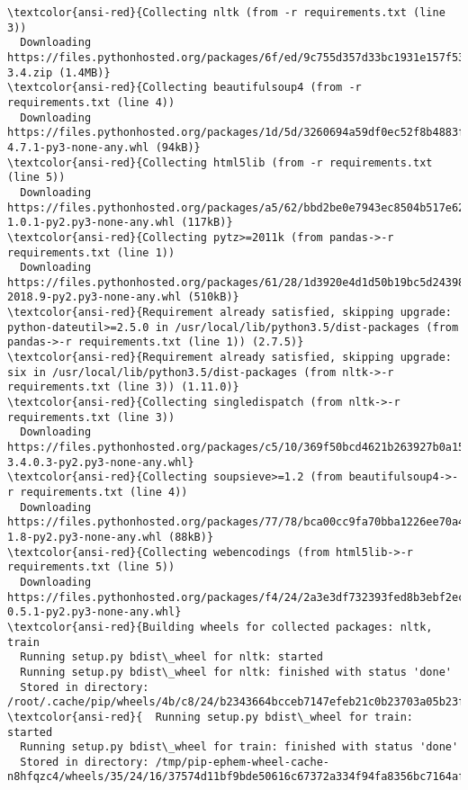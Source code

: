 \documentclass[11pt]{article}
\begin{document}
\begin{Verbatim}[commandchars=\\\{\}]
\textcolor{ansi-red}{Collecting nltk (from -r requirements.txt (line 3))
  Downloading https://files.pythonhosted.org/packages/6f/ed/9c755d357d33bc1931e157f537721efb5b88d2c583fe593cc09603076cc3/nltk-3.4.zip (1.4MB)}
\textcolor{ansi-red}{Collecting beautifulsoup4 (from -r requirements.txt (line 4))
  Downloading https://files.pythonhosted.org/packages/1d/5d/3260694a59df0ec52f8b4883f5d23b130bc237602a1411fa670eae12351e/beautifulsoup4-4.7.1-py3-none-any.whl (94kB)}
\textcolor{ansi-red}{Collecting html5lib (from -r requirements.txt (line 5))
  Downloading https://files.pythonhosted.org/packages/a5/62/bbd2be0e7943ec8504b517e62bab011b4946e1258842bc159e5dfde15b96/html5lib-1.0.1-py2.py3-none-any.whl (117kB)}
\textcolor{ansi-red}{Collecting pytz>=2011k (from pandas->-r requirements.txt (line 1))
  Downloading https://files.pythonhosted.org/packages/61/28/1d3920e4d1d50b19bc5d24398a7cd85cc7b9a75a490570d5a30c57622d34/pytz-2018.9-py2.py3-none-any.whl (510kB)}
\textcolor{ansi-red}{Requirement already satisfied, skipping upgrade: python-dateutil>=2.5.0 in /usr/local/lib/python3.5/dist-packages (from pandas->-r requirements.txt (line 1)) (2.7.5)}
\textcolor{ansi-red}{Requirement already satisfied, skipping upgrade: six in /usr/local/lib/python3.5/dist-packages (from nltk->-r requirements.txt (line 3)) (1.11.0)}
\textcolor{ansi-red}{Collecting singledispatch (from nltk->-r requirements.txt (line 3))
  Downloading https://files.pythonhosted.org/packages/c5/10/369f50bcd4621b263927b0a1519987a04383d4a98fb10438042ad410cf88/singledispatch-3.4.0.3-py2.py3-none-any.whl}
\textcolor{ansi-red}{Collecting soupsieve>=1.2 (from beautifulsoup4->-r requirements.txt (line 4))
  Downloading https://files.pythonhosted.org/packages/77/78/bca00cc9fa70bba1226ee70a42bf375c4e048fe69066a0d9b5e69bc2a79a/soupsieve-1.8-py2.py3-none-any.whl (88kB)}
\textcolor{ansi-red}{Collecting webencodings (from html5lib->-r requirements.txt (line 5))
  Downloading https://files.pythonhosted.org/packages/f4/24/2a3e3df732393fed8b3ebf2ec078f05546de641fe1b667ee316ec1dcf3b7/webencodings-0.5.1-py2.py3-none-any.whl}
\textcolor{ansi-red}{Building wheels for collected packages: nltk, train
  Running setup.py bdist\_wheel for nltk: started
  Running setup.py bdist\_wheel for nltk: finished with status 'done'
  Stored in directory: /root/.cache/pip/wheels/4b/c8/24/b2343664bcceb7147efeb21c0b23703a05b23fcfeaceaa2a1e}
\textcolor{ansi-red}{  Running setup.py bdist\_wheel for train: started
  Running setup.py bdist\_wheel for train: finished with status 'done'
  Stored in directory: /tmp/pip-ephem-wheel-cache-n8hfqzc4/wheels/35/24/16/37574d11bf9bde50616c67372a334f94fa8356bc7164af8ca3}

\end{Verbatim}
\end{document}
